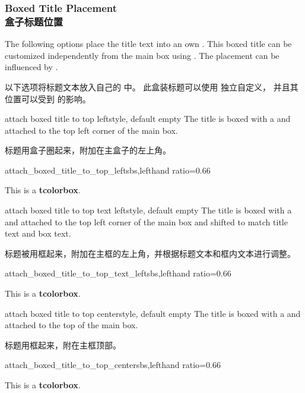 \subsubsection{Boxed Title Placement\\盒子标题位置}

The following options place the title text into an own .
This boxed title can be customized independently from the main box using
.
The placement can be influenced by .

以下选项将标题文本放入自己的  中。 此盒装标题可以使用  独立自定义， 并且其位置可以受到  的影响。

\begin{docTcbKey}{attach boxed title to top left}{}{style, default empty}
The title is boxed with a  and attached to
the top left corner of the main box.

标题用盒子圈起来，附加在主盒子的左上角。
\begin{exdispExample*}{attach_boxed_title_to_top_left}{sbs,lefthand ratio=0.66}
\begin{tcolorbox}[enhanced,title=My title,
  attach boxed title to top left]
  This is a \textbf{tcolorbox}.
\end{tcolorbox}
\end{exdispExample*}
\end{docTcbKey}

\begin{docTcbKey}[][doc new=2021-07-30]{attach boxed title to top text left}{}{style, default empty}
The title is boxed with a  and attached to
the top left corner of the main box
and shifted to match title text and box text.

标题被用框起来，附加在主框的左上角，并根据标题文本和框内文本进行调整。

\begin{exdispExample*}{attach_boxed_title_to_top_text_left}{sbs,lefthand ratio=0.66}
\begin{tcolorbox}[enhanced,title=My title,
attach boxed title to top text left]
This is a \textbf{tcolorbox}.
\end{tcolorbox}
\end{exdispExample*}
\end{docTcbKey}

\begin{docTcbKey}{attach boxed title to top center}{}{style, default empty}
The title is boxed with a  and attached to
the top of the main box.

标题用框起来，附在主框顶部。
\begin{exdispExample*}{attach_boxed_title_to_top_center}{sbs,lefthand ratio=0.66}
\begin{tcolorbox}[enhanced,title=My title,
  attach boxed title to top center]
  This is a \textbf{tcolorbox}.
\end{tcolorbox}
\end{exdispExample*}
\end{docTcbKey}

